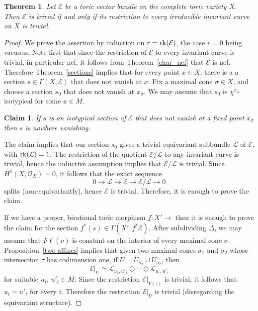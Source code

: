 \documentclass[12pt]{amsart}
\newtheorem{theorem}[lemma]{Theorem}
\newtheorem*{claim}{Claim}
\theoremstyle{definition}
\theoremstyle{remark}
\begin{document}
\begin{theorem}\label{trivial}
Let ${\mathcal{E}}$ be a toric vector bundle on the complete toric variety
$X$. Then ${\mathcal{E}}$ is trivial if and only if its restriction to every
irreducible invariant curve on $X$ is trivial.
\end{theorem}

\begin{proof}
We prove the assertion by induction on $r={\rm rk}({\mathcal{E}})$, the case
$r=0$ being vacuous. Note first that since the restriction of ${\mathcal{E}}$
to every invariant curve is trivial, in particular nef, it follows
from Theorem~\ref{char_nef} that ${\mathcal{E}}$ is nef. Therefore
Theorem~\ref{sections} implies that for every point $x\in X$, there
is a a section $s\in \Gamma(X,{\mathcal{E}})$ that does not vanish at $x$. Fix
a maximal cone $\sigma\in X$, and choose a section $s_0$ that does
not vanish at $x_{\sigma}$. We may assume that $s_0$ is
$\chi^u$-isotypical for some $u\in M$.

\noindent\begin{claim} If $s$ is an isotypical section of ${\mathcal{E}}$ that
does not vanish at a fixed point $x_{\sigma}$ then $s$ is nowhere
vanishing.
\end{claim}

The claim implies that our section $s_0$ gives a trivial equivariant
subbundle ${\mathcal{L}}$ of ${\mathcal{E}}$, with ${\rm rk}({\mathcal{L}})=1$. The restriction of
the quotient ${\mathcal{E}}/{\mathcal{L}}$ to any invariant curve is trivial, hence the
inductive assumption implies that ${\mathcal{E}}/{\mathcal{L}}$ is trivial. Since
$H^1(X,{\mathcal{O}}_X)=0$, it follows that the exact sequence
\[
0 \rightarrow {\mathcal{L}} \rightarrow {\mathcal{E}} \rightarrow {\mathcal{E}}/ {\mathcal{L}} \rightarrow 0
\]
splits (non-equivariantly),  hence ${\mathcal{E}}$ is trivial. Therefore, it is
enough to prove the claim.

If  we have a proper, birational toric morphism 
$f\colon X'{\xrightarrow{\ \ }}$ then it is
enough to prove the claim for the section
$f^*(s)\in\Gamma(X',f^*{\mathcal{E}})$. After subdividing $\Delta$, we may
assume that ${F\ell}(v)$ is constant on the interior of every maximal
cone $\sigma$. Proposition~\ref{two affines} implies that given two
maximal cones $\sigma_1$ and $\sigma_2$ whose intersection $\tau$
has codimension one, if $U=U_{\sigma_1}\cup U_{\sigma_2}$, then
$${\mathcal{E}}\vert_U\simeq{\mathcal{L}}_{u_1,u'_1}\oplus\cdots\oplus{\mathcal{L}}_{u_r,u'_r}$$ for suitable
$u_i$, $u'_i\in M$. Since the restriction ${\mathcal{E}}\vert_{V(\tau)}$ is
trivial, it follows that $u_i=u'_i$ for every $i$. Therefore the
restriction ${\mathcal{E}}\vert_U$ is trivial (disregarding the equivariant
structure).


\end{proof}
\end{document}
